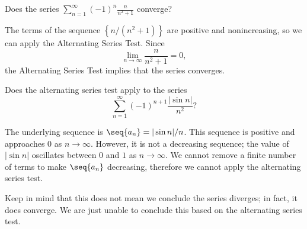 \documentclass{ximera}
\begin{document}
\begin{example}
Does the series $\sum_{n=1}^\infty (-1)^n\frac{n}{n^2+1}$ converge?

The terms of the sequence $\left\{n/(n^2+1)\right\}$ are positive and nonincreasing, so we can apply the Alternating Series Test. Since
$$
\lim_{n \rightarrow \infty} \frac{n}{n^2+1} = 0,
$$
the Alternating Series Test implies that the series converges.
\end{example}


    \begin{question}
      Does the alternating series test apply to the series
      \[
      \sum_{n=1}^\infty (-1)^{n+1}\frac{|\sin n|}{n^2}?
      \]
      \begin{prompt}
        \begin{multipleChoice}
        \end{multipleChoice}
        \begin{feedback}
          The underlying sequence is $\seq{a_n} = |\sin n|/n$. This
          sequence is positive and approaches $0$ as
          $n\to\infty$. However, it is not a decreasing sequence; the
          value of $|\sin n|$ oscillates between $0$ and $1$ as
          $n\to\infty$. We cannot remove a finite number of terms to
          make $\seq{a_n}$ decreasing, therefore we cannot apply the
          alternating series test.
	  
          Keep in mind that this does not mean we conclude the series
          diverges; in fact, it does converge. We are just unable to
          conclude this based on the alternating series test.
        \end{feedback}
      \end{prompt}
    \end{question}
\end{document}
